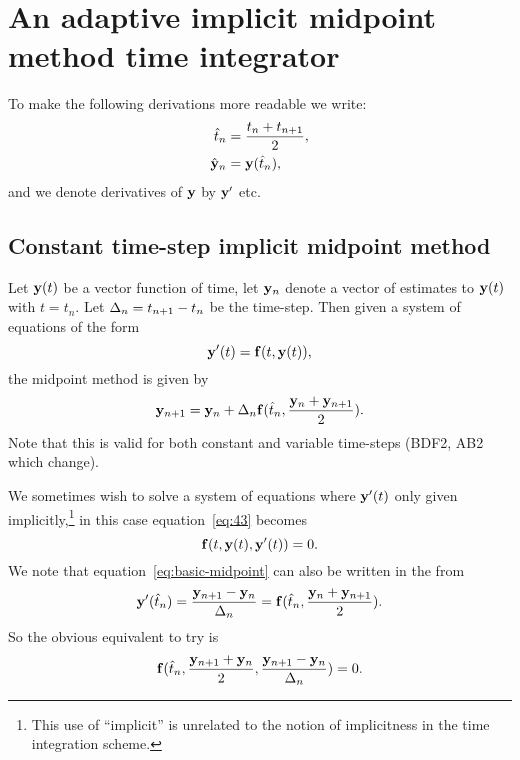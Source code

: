 

\section{An adaptive implicit midpoint method time integrator}









To make the following derivations more readable we write:
\begin{align}
  \hat{t}_n &= \frac{t_n + t_{n+1}}{2}, \notag\\
  \hat{\mathbf{y}}_n &= \mathbf{y}(\hat{t}_n),
\end{align}
and we denote derivatives of $\mathbf{y}$ by $\mathbf{y}'$ etc.


\subsection{Constant time-step implicit midpoint method}

Let $\mathbf{y}(t)$ be a vector function of time, let $\mathbf{y}_n$ denote a vector of estimates to $\mathbf{y}(t)$ with $t = t_n$.
Let $\Delta_{n} = t_{n+1} - t_n$ be the time-step.
Then given a system of equations of the form
\begin{equation}
  \mathbf{y}'(t) = {\mathbf{f}}(t, \mathbf{y}(t)),
  \label{eq:43}
\end{equation}
the midpoint method is given by
\begin{equation}
  \mathbf{y}_{n+1} = \mathbf{y}_n + \Delta_{n} {\mathbf{f}}(\hat{t}_n, \frac{\mathbf{y}_n + \mathbf{y}_{n+1}}{2}).
  \label{eq:basic-midpoint}
\end{equation}
Note that this is valid for both constant and variable time-steps (\cf BDF2, AB2 which change).

We sometimes wish to solve a system of equations where $\mathbf{y}'(t)$ only given implicitly,\footnote{This use of ``implicit'' is unrelated to the notion of implicitness in the time integration scheme.} in this case equation~\eqref{eq:43} becomes
\begin{equation}
  {\mathbf{f}}(t, \mathbf{y}(t), \mathbf{y}'(t)) = 0.
\end{equation}
We note that equation~\eqref{eq:basic-midpoint} can also be written in the from
\begin{equation}
  \mathbf{y}'(\hat{t}_n) = \frac{\mathbf{y}_{n+1} - \mathbf{y}_n}{\Delta_{n}} =  {\mathbf{f}}(\hat{t}_n, \frac{\mathbf{y}_n + \mathbf{y}_{n+1}}{2}).
\end{equation}
So the obvious equivalent to try is
\begin{equation}
  {\mathbf{f}}(\hat{t}_n, \frac{\mathbf{y}_{n+1} + \mathbf{y}_n}{2}, \frac{\mathbf{y}_{n+1} - \mathbf{y}_n}{\Delta_{n}}) = 0.
\end{equation}


